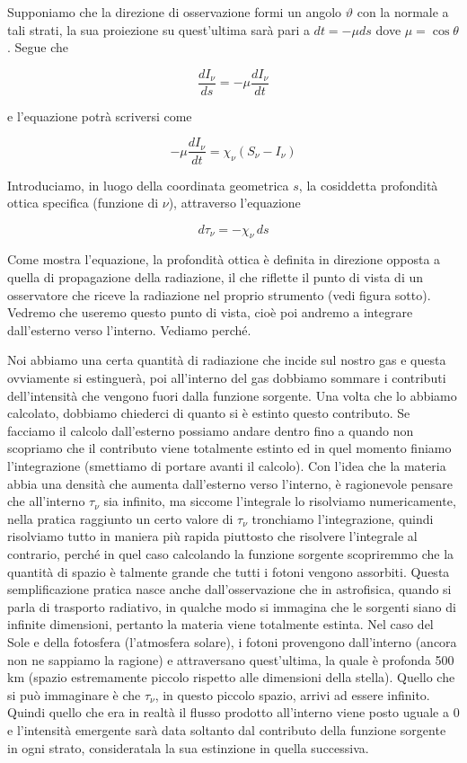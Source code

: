 Supponiamo che la direzione di osservazione formi un angolo $\vartheta$ con la normale a tali strati, la sua proiezione su quest'ultima sarà pari a $dt=-\mu ds$ dove $\mu=\cos\theta$. Segue che

$$\frac{dI_{\nu}}{ds}=-\mu\frac{dI_{\nu}}{dt}$$

e l'equazione potrà scriversi come

\begin{equation}
  -\mu\frac{dI_{\nu}}{dt}=\chi_{\nu}(S_{\nu}-I_{\nu})
\end{equation}

Introduciamo, in luogo della coordinata geometrica $s$, la cosiddetta profondità ottica specifica (funzione di $\nu$), attraverso l'equazione

$$d \tau_{\nu}=-\chi_{\nu} \, ds$$

Come mostra l'equazione, la profondità ottica è definita in direzione opposta a quella di propagazione della radiazione, il che riflette il punto di vista di un osservatore che riceve la radiazione nel proprio strumento (vedi figura sotto). Vedremo che useremo questo punto di vista, cioè poi andremo a integrare dall'esterno verso l'interno. Vediamo perché.

Noi abbiamo una certa quantità di radiazione che incide sul nostro gas e questa ovviamente si estinguerà, poi all'interno del gas dobbiamo sommare i contributi dell'intensità che vengono fuori dalla funzione sorgente. Una volta che lo abbiamo calcolato, dobbiamo chiederci di quanto si è estinto questo contributo. Se facciamo il calcolo dall'esterno possiamo andare dentro fino a quando non scopriamo che il contributo viene totalmente estinto ed in quel momento finiamo l'integrazione (smettiamo di portare avanti il calcolo). Con l'idea che la materia abbia una densità che aumenta dall'esterno verso l'interno, è ragionevole pensare che all'interno $\tau_{\nu}$ sia infinito, ma siccome l'integrale lo risolviamo numericamente, nella pratica raggiunto un certo valore di $\tau_{\nu}$ tronchiamo l'integrazione, quindi risolviamo tutto in maniera più rapida piuttosto che risolvere l'integrale al contrario, perché in quel caso calcolando la funzione sorgente scopriremmo che la quantità di spazio è talmente grande che tutti i fotoni vengono assorbiti. Questa semplificazione pratica nasce anche dall'osservazione che in astrofisica, quando si parla di trasporto radiativo, in qualche modo si immagina che le sorgenti siano di infinite dimensioni, pertanto la materia viene totalmente estinta. Nel caso del Sole e della fotosfera (l'atmosfera solare), i fotoni provengono dall'interno (ancora non ne sappiamo la ragione) e attraversano quest'ultima, la quale è profonda 500 km (spazio estremamente piccolo rispetto alle dimensioni della stella). Quello che si può immaginare è che $\tau_{\nu}$, in questo piccolo spazio, arrivi ad essere infinito. Quindi quello che era in realtà il flusso prodotto all'interno viene posto uguale a 0 e l'intensità emergente sarà data soltanto dal contributo della funzione sorgente in ogni strato, consideratala la sua estinzione in quella successiva.

